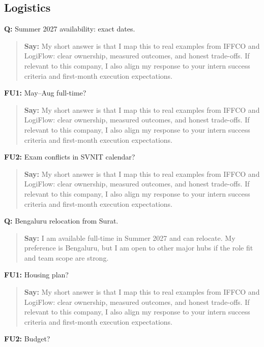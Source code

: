 \documentclass[9pt,a4paper]{article}
\begin{document}
\subsection{Logistics}
\textbf{Q:} Summer 2027 availability: exact dates.

\begin{quote}\small\textbf{Say:} My short answer is that I map this to real examples from IFFCO and LogiFlow: clear ownership, measured outcomes, and honest trade-offs. If relevant to this company, I also align my response to your intern success criteria and first-month execution expectations.\end{quote}
\vspace{2mm}
\textbf{FU1:} May--Aug full-time?

\begin{quote}\small\textbf{Say:} My short answer is that I map this to real examples from IFFCO and LogiFlow: clear ownership, measured outcomes, and honest trade-offs. If relevant to this company, I also align my response to your intern success criteria and first-month execution expectations.\end{quote}
\vspace{2mm}
\textbf{FU2:} Exam conflicts in SVNIT calendar?

\begin{quote}\small\textbf{Say:} My short answer is that I map this to real examples from IFFCO and LogiFlow: clear ownership, measured outcomes, and honest trade-offs. If relevant to this company, I also align my response to your intern success criteria and first-month execution expectations.\end{quote}
\vspace{2mm}
\textbf{Q:} Bengaluru relocation from Surat.

\begin{quote}\small\textbf{Say:} I am available full-time in Summer 2027 and can relocate. My preference is Bengaluru, but I am open to other major hubs if the role fit and team scope are strong.\end{quote}
\vspace{2mm}
\textbf{FU1:} Housing plan?

\begin{quote}\small\textbf{Say:} My short answer is that I map this to real examples from IFFCO and LogiFlow: clear ownership, measured outcomes, and honest trade-offs. If relevant to this company, I also align my response to your intern success criteria and first-month execution expectations.\end{quote}
\vspace{2mm}
\textbf{FU2:} Budget?
\end{document}

